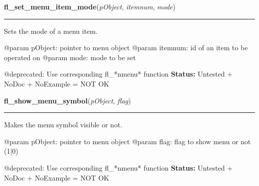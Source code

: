     \vspace{0.5ex}

\hspace{.8\funcindent}\begin{boxedminipage}{\funcwidth}

    \raggedright \textbf{fl\_set\_menu\_item\_mode}(\textit{pObject}, \textit{itemnum}, \textit{mode})

    \vspace{-1.5ex}

    \rule{\textwidth}{0.5\fboxrule}
\setlength{\parskip}{2ex}

Sets the mode of a menu item.

@param pObject: pointer to menu object
@param itemnum: id of an item to be operated on
@param mode: mode to be set

@deprecated: Use corresponding fl\_*nmenu* function
\setlength{\parskip}{1ex}
\textbf{Status:} 
Untested + NoDoc + NoExample = NOT OK


    \end{boxedminipage}

    \label{xformslib:deprecated:fl_show_menu_symbol}

    \vspace{0.5ex}

\hspace{.8\funcindent}\begin{boxedminipage}{\funcwidth}

    \raggedright \textbf{fl\_show\_menu\_symbol}(\textit{pObject}, \textit{flag})

    \vspace{-1.5ex}

    \rule{\textwidth}{0.5\fboxrule}
\setlength{\parskip}{2ex}

Makes the menu symbol visible or not.

@param pObject: pointer to menu object
@param flag: flag to show menu or not (1|0)

@deprecated: Use corresponding fl\_*nmenu* function
\setlength{\parskip}{1ex}
\textbf{Status:} 
Untested + NoDoc + NoExample = NOT OK


    \end{boxedminipage}

    \label{xformslib:deprecated:fl_set_menu_popup}

